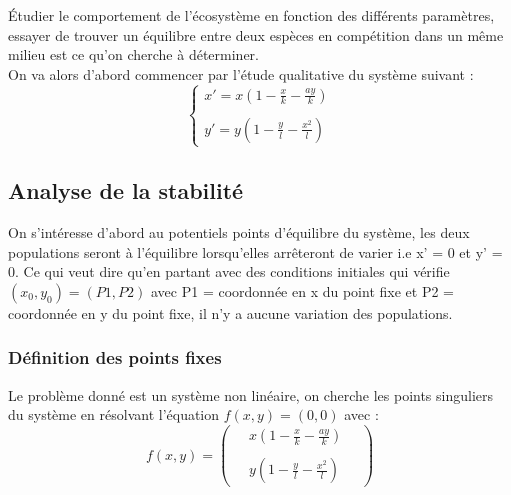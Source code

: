 \documentclass{article}
\begin{document}
Étudier le comportement de l'écosystème en fonction des différents paramètres, essayer de trouver un équilibre entre deux espèces en compétition dans un même milieu est ce qu'on cherche à déterminer.\\

On va alors d'abord commencer par l'étude qualitative du système suivant :\\
\vspace{1cm}
\begin{equation}
\tag{S}
\left\{
\begin{array}{cc}
   x' =  x(1 - \frac{x}{k} - \frac{a y}{k}) \\\\
   y' = y(1- \frac{y}{l} - \frac{x^{2}}{l})
\end{array}
\right.
\end{equation}

\newpage

\subsection{Analyse de la stabilité}
On s'intéresse d'abord au potentiels points d'équilibre du système, les deux populations seront à l'équilibre lorsqu'elles arrêteront de varier i.e x' = 0 et y' = 0. Ce qui veut dire qu'en partant avec des conditions initiales qui vérifie $(x_{0},y_{0}) = (P1, P2)$
avec P1 = coordonnée en x du point fixe et P2 = coordonnée en y du point fixe, il n'y a aucune variation des populations.
\subsubsection{Définition des points fixes}

Le problème donné est un système non linéaire, on cherche les points singuliers du système en résolvant l'équation $f(x,y) = (0,0) $ avec :
\begin{equation*}
    f(x,y) = 
    \begin{pmatrix}
        \quad x(1 - \frac{x}{k} - \frac{a y}{k})\phantom{\quad}\\\\
        \quad y(1- \frac{y}{l} - \frac{x^{2}}{l})\phantom{\quad}
    \end{pmatrix}
\end{equation*}
\end{document}
